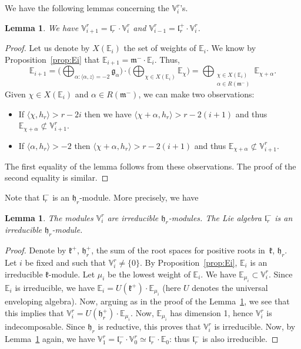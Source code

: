 \documentclass[10pt]{amsart}
\theoremstyle{plain}
\newtheorem{lemm}[theo]{Lemma}
\theoremstyle{definition}
\let\rgy r
\newcommand{\bE}{\mathbb{E}}
\newcommand{\Vr}{\mathbb{V}^\rgy}
\newcommand{\fgg}{\mathfrak{g}}
\newcommand{\fh}{\mathfrak{h}}
\newcommand{\fk}{\mathfrak{k}}
\newcommand{\fl}{\mathfrak{l}}
\newcommand{\fm}{\mathfrak{m}}
\newcommand{\scal}[1]{\langle #1 \rangle}
\begin{document}
We have the following lemmas concerning the $\Vr_i$'s.
\begin{lemm}
\label{lemm:Viplus1}
We have $\Vr_{i+1} = \fl_\rgy^- \cdot \Vr_i$ and $\Vr_{i-1} = \fl_\rgy^+ \cdot \Vr_i$.
\end{lemm}
\begin{proof}
Let us denote by $X(\bE_i)$ the set of weights
of $\bE_i$. We know by Proposition~\ref{prop:Ei} that $\bE_{i+1} = \fm^-\cdot \bE_i$. Thus,
$$
\bE_{i+1} = \biggl (\bigoplus_{\alpha:\scal{\alpha,z} = -2} \fgg_\alpha \biggr) \cdot
\biggl (\bigoplus_{\chi \in X(\bE_i)} \bE_\chi \biggr) =
\bigoplus_{\substack{\chi \in X(\bE_i)\\ \alpha \in R(\fm^-)}} \bE_{\chi+\alpha} .
$$
Given $\chi \in X(\bE_i)$ and $\alpha \in R(\fm^-)$, we can make two observations:
\begin{itemize}
\item If $\scal{\chi,h_\rgy} > r - 2i$ then we have $\scal{\chi+\alpha,h_\rgy} > \rgy -2(i+1)$ and thus
$\bE_{\chi + \alpha} \not \subset \Vr_{i+1}$.
\item If $\scal{\alpha,h_\rgy} > -2$ then $\scal{\chi+\alpha,h_\rgy} > \rgy -2(i+1)$ and thus
$\bE_{\chi + \alpha} \not \subset \Vr_{i+1}$.
\end{itemize}
The first equality of the lemma follows from these observations.
The proof of the second equality is similar.
\end{proof}

Note that $\fl_\rgy^-$ is an $\fh_\rgy$-module. More precisely, we have

\begin{lemm}
\label{lemm:Vi-irr}
The modules $\Vr_i$ are irreducible $\fh_\rgy$-modules.
The Lie algebra $\fl_\rgy^-$ is an irreducible $\fh_\rgy$-module.
\end{lemm}
\begin{proof}
Denote by $\fk^+$, \resp $\fh_\rgy^+$, the sum of the root spaces for positive roots in~$\fk$, \resp $\fh_\rgy$.
Let $i$ be fixed and such that $\Vr_i \neq \{0\}$. By Proposition~\ref{prop:Ei}, $\bE_i$ is an
irreducible $\fk$-module.
Let $\mu_i$ be the lowest weight of $\bE_i$. We have $\bE_{\mu_i} \subset \Vr_i$.
Since $\bE_i$ is irreducible, we have $\bE_i = U(\fk^+) \cdot \bE_{\mu_i}$ (here $U$ denotes the
universal enveloping algebra). Now, arguing as in the proof
of the Lemma~\ref{lemm:Viplus1}, we see that this implies that $\Vr_i = U(\fh_\rgy^+) \cdot
\bE_{\mu_i}$. Now, $\bE_{\mu_i}$ has dimension 1, hence $\Vr_i$ is indecomposable. Since $\fh_\rgy$ is reductive, this proves that $\Vr_i$ is irreducible.
Now, by Lemma~\ref{lemm:Viplus1} again, we have $\Vr_1 = \fl_\rgy^- \cdot \Vr_0 \simeq \fl_\rgy^- \cdot \bE_0$: thus
$\fl_\rgy^-$ is also irreducible.
\end{proof}
\end{document}
